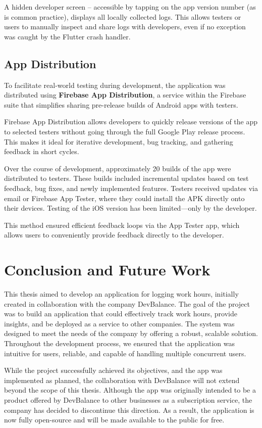 \documentclass[
  digital,     %
  oneside,     %
  nosansbold,  %
  nocolorbold, %
  lof,         %
  lot,         %
]{fithesis4}
\begin{document}
A hidden developer screen -- accessible by tapping on the app version number (as is common practice), displays all locally collected logs. This allows testers or users to manually inspect and share logs with developers, even if no exception was caught by the Flutter crash handler.

\section{App Distribution}

To facilitate real-world testing during development, the application was distributed using \textbf{Firebase App Distribution}, a service within the Firebase suite that simplifies sharing pre-release builds of Android apps with testers.

Firebase App Distribution allows developers to quickly release versions of the app to selected testers without going through the full Google Play release process. This makes it ideal for iterative development, bug tracking, and gathering feedback in short cycles.

Over the course of development, approximately 20 builds of the app were distributed to testers. These builds included incremental updates based on test feedback, bug fixes, and newly implemented features. Testers received updates via email or Firebase App Tester, where they could install the \gls{APK} directly onto their devices. Testing of the \gls{iOS} version has been limited—only by the developer.

This method ensured efficient feedback loops via the App Tester app, which allows users to conveniently provide feedback directly to the developer.

\chapter{Conclusion and Future Work}

This thesis aimed to develop an application for logging work hours, initially created in collaboration with the company DevBalance. The goal of the project was to build an application that could effectively track work hours, provide insights, and be deployed as a service to other companies. The system was designed to meet the needs of the company by offering a robust, scalable solution. Throughout the development process, we ensured that the application was intuitive for users, reliable, and capable of handling multiple concurrent users.

While the project successfully achieved its objectives, and the app was implemented as planned, the collaboration with DevBalance will not extend beyond the scope of this thesis. Although the app was originally intended to be a product offered by DevBalance to other businesses as a subscription service, the company has decided to discontinue this direction. As a result, the application is now fully open-source and will be made available to the public for free.
\end{document}
